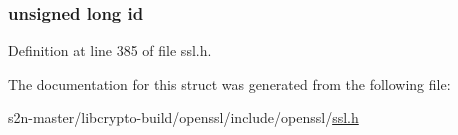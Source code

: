 \subsubsection[{\texorpdfstring{id}{id}}]{\setlength{\rightskip}{0pt plus 5cm}unsigned long id}\hypertarget{structsrtp__protection__profile__st_af17b8bd946e0f93c6550050f9e8aa349}{}\label{structsrtp__protection__profile__st_af17b8bd946e0f93c6550050f9e8aa349}


Definition at line 385 of file ssl.\+h.



The documentation for this struct was generated from the following file\+:\begin{DoxyCompactItemize}
\item 
s2n-\/master/libcrypto-\/build/openssl/include/openssl/\hyperlink{include_2openssl_2ssl_8h}{ssl.\+h}\end{DoxyCompactItemize}
